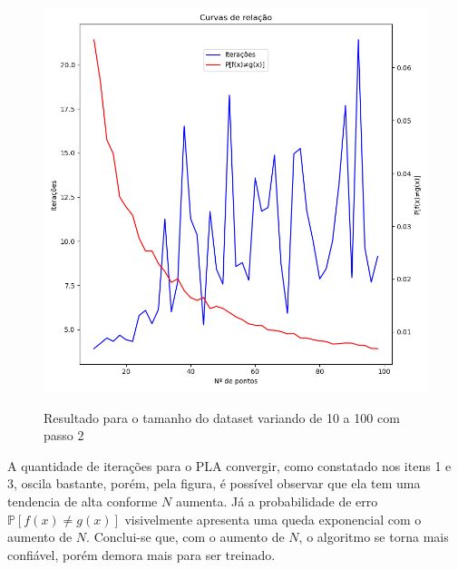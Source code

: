 \begin{enumerate}
    \begin{figure}[H]
        \caption{Resultado para o tamanho do dataset variando de 10 a 100 com passo 2}
           \centering
           \includegraphics[width=12cm]{perceptron_relationship_plot.png}
        \label{fig:perceptron_relationship_plot}
    \end{figure}

    A quantidade de iterações para o PLA convergir, como constatado nos itens 1 e 3, oscila bastante, porém, pela figura, é possível observar que ela tem uma tendencia de alta conforme $N$ aumenta. Já a probabilidade de erro $\mathbb{P}[f(x) \neq g(x)]$ visivelmente apresenta uma queda exponencial com o aumento de $N$. Conclui-se que, com o aumento de $N$, o algoritmo se torna mais confiável, porém demora mais para ser treinado.
    
    
\end{enumerate}